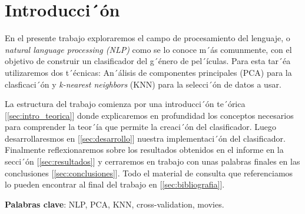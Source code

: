 \section{Introducci´ón}

En el presente trabajo exploraremos el campo de procesamiento del lenguaje, o \textit{natural language processing (NLP)} como se lo conoce m´ás comunmente, con el objetivo de construir un clasificador del g´énero de pel´ículas. Para esta tar´éa utilizaremos dos t´écnicas: An´álisis de componentes principales (PCA) para la clasficaci´ón y \textit{k-nearest neighbors} (KNN) para la selecci´ón de datos a usar.

La estructura del trabajo comienza por una introducci´ón te´órica [\ref{sec:intro_teorica}] donde explicaremos en profundidad los conceptos necesarios para comprender la teor´ía que permite la creaci´ón del clasificador. Luego desarrollaresmos en [\ref{sec:desarrollo}] nuestra implementaci´ón del clasificador. Finalmente reflexionaremos sobre los resultados obtenidos en el informe en la secci´ón [\ref{sec:resultados}] y cerraremos en trabajo con unas palabras finales en las conclusiones [\ref{sec:conclusiones}]. Todo el material de consulta que referenciamos lo pueden encontrar al final del trabajo en [\ref{sec:bibliografia}].

\textbf{Palabras clave}: NLP, PCA, KNN, cross-validation, movies.